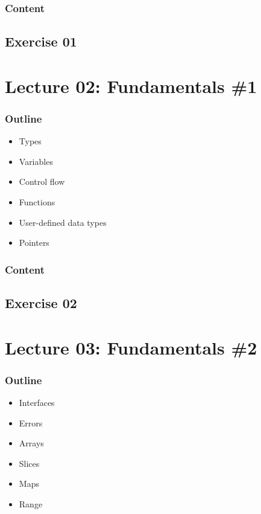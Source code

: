\documentclass[
  digital,
  color,
  oneside,
  nosansbold,
  nocolorbold,
  lof,
  nolot,
]{fithesis4}
\begin{document}
\subsubsection{Content}

\subsection{Exercise 01}

\section{Lecture 02: Fundamentals \#1}

\subsubsection{Outline}

\begin{itemize}
    \item Types
    \item Variables
    \item Control flow
    \item Functions
    \item User-defined data types
    \item Pointers
\end{itemize}

\subsubsection{Content}

\subsection{Exercise 02}

\section{Lecture 03: Fundamentals \#2}

\subsubsection{Outline}

\begin{itemize}
    \item Interfaces
    \item Errors
    \item Arrays
    \item Slices
    \item Maps
    \item Range
\end{itemize}
\end{document}
